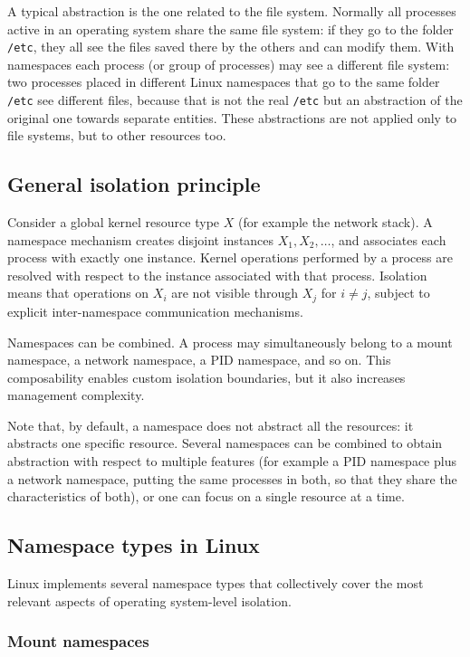 A typical abstraction is the one related to the file system. Normally all processes active in an operating system share the same file system: if they go to the folder \texttt{/etc}, they all see the files saved there by the others and can modify them. With namespaces each process (or group of processes) may see a different file system: two processes placed in different Linux namespaces that go to the same folder \texttt{/etc} see different files, because that is not the real \texttt{/etc} but an abstraction of the original one towards separate entities. These abstractions are not applied only to file systems, but to other resources too.

\subsection{General isolation principle}

Consider a global kernel resource type $X$ (for example the network stack). A namespace mechanism creates disjoint instances $X_1, X_2, \dots$, and associates each process with exactly one instance. Kernel operations performed by a process are resolved with respect to the instance associated with that process. Isolation means that operations on $X_i$ are not visible through $X_j$ for $i \neq j$, subject to explicit inter-namespace communication mechanisms.

Namespaces can be combined. A process may simultaneously belong to a mount namespace, a network namespace, a PID namespace, and so on. This composability enables custom isolation boundaries, but it also increases management complexity.

Note that, by default, a namespace does not abstract all the resources: it abstracts one specific resource. Several namespaces can be combined to obtain abstraction with respect to multiple features (for example a PID namespace plus a network namespace, putting the same processes in both, so that they share the characteristics of both), or one can focus on a single resource at a time.

\subsection{Namespace types in Linux}

Linux implements several namespace types that collectively cover the most relevant aspects of operating system-level isolation.

\subsubsection*{Mount namespaces}

